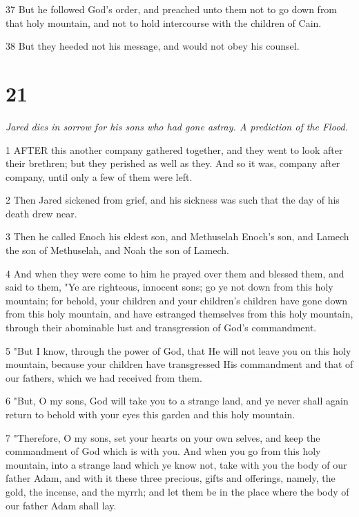 \par 37 But he followed God's order, and preached unto them not to go down from that holy mountain, and not to hold intercourse with the children of Cain.

\par 38 But they heeded not his message, and would not obey his counsel.

\chapter{21}

\par \textit{Jared dies in sorrow for his sons who had gone astray. A prediction of the Flood.}

\par 1 AFTER this another company gathered together, and they went to look after their brethren; but they perished as well as they. And so it was, company after company, until only a few of them were left.

\par 2 Then Jared sickened from grief, and his sickness was such that the day of his death drew near.

\par 3 Then he called Enoch his eldest son, and Methuselah Enoch's son, and Lamech the son of Methuselah, and Noah the son of Lamech.

\par 4 And when they were come to him he prayed over them and blessed them, and said to them, "Ye are righteous, innocent sons; go ye not down from this holy mountain; for behold, your children and your children's children have gone down from this holy mountain, and have estranged themselves from this holy mountain, through their abominable lust and transgression of God's commandment.

\par 5 "But I know, through the power of God, that He will not leave you on this holy mountain, because your children have transgressed His commandment and that of our fathers, which we had received from them.

\par 6 "But, O my sons, God will take you to a strange land, and ye never shall again return to behold with your eyes this garden and this holy mountain.

\par 7 "Therefore, O my sons, set your hearts on your own selves, and keep the commandment of God which is with you. And when you go from this holy mountain, into a strange land which ye know not, take with you the body of our father Adam, and with it these three precious, gifts and offerings, namely, the gold, the incense, and the myrrh; and let them be in the place where the body of our father Adam shall lay.

